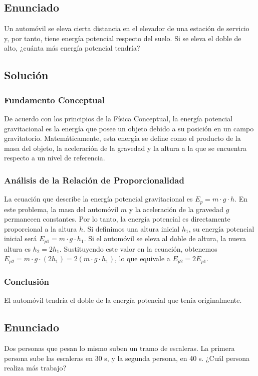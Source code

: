 \documentclass[12pt,a4paper]{article}
\begin{document}
\subsection*{Enunciado}
Un automóvil se eleva cierta distancia en el elevador de una estación de servicio y, por tanto, tiene energía potencial respecto del suelo. Si se eleva el doble de alto, ¿cuánta más energía potencial tendría?

\subsection*{Solución}

\subsubsection*{Fundamento Conceptual}
De acuerdo con los principios de la Física Conceptual, la energía potencial gravitacional es la energía que posee un objeto debido a su posición en un campo gravitatorio. Matemáticamente, esta energía se define como el producto de la masa del objeto, la aceleración de la gravedad y la altura a la que se encuentra respecto a un nivel de referencia. 

\subsubsection*{Análisis de la Relación de Proporcionalidad}
La ecuación que describe la energía potencial gravitacional es $E_p = m \cdot g \cdot h$. En este problema, la masa del automóvil $m$ y la aceleración de la gravedad $g$ permanecen constantes. Por lo tanto, la energía potencial es directamente proporcional a la altura $h$. Si definimos una altura inicial $h_1$, su energía potencial inicial será $E_{p1} = m \cdot g \cdot h_1$. Si el automóvil se eleva al doble de altura, la nueva altura es $h_2 = 2h_1$. Sustituyendo este valor en la ecuación, obtenemos $E_{p2} = m \cdot g \cdot (2h_1) = 2(m \cdot g \cdot h_1)$, lo que equivale a $E_{p2} = 2E_{p1}$.

\subsubsection*{Conclusión}
El automóvil tendría el doble de la energía potencial que tenía originalmente.

\newpage
\subsection*{Enunciado}
Dos personas que pesan lo mismo suben un tramo de escaleras. La primera persona sube las escaleras en 30 s, y la segunda persona, en 40 s. ¿Cuál persona realiza más trabajo?
\end{document}
